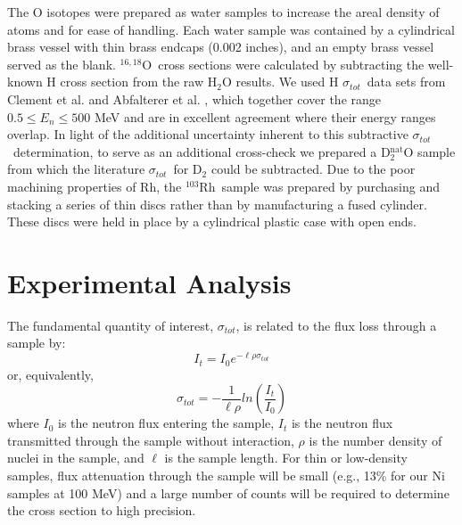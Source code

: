 \documentclass[twocolumn,secnumarabic,amssymb, nobibnotes, aps, prl,
superscriptaddress, nobalancelastpage]{revtex4}
\newcommand{\tot}{\ensuremath{\sigma_{tot}}}
\newcommand{\oSixEight}{\ensuremath{^{16,18}}O}
\newcommand{\rhThree}{\ensuremath{^{103}}R\lowercase{h}}
\begin{document}
The O isotopes were prepared as water samples to increase the areal density
of atoms and for ease of handling. Each water sample was contained by a
cylindrical brass vessel with thin brass endcaps (0.002 inches), and an
empty brass vessel served as the blank. \oSixEight\
cross sections were calculated by
subtracting the well-known H cross section from the raw H$_{2}$O results.
We used H \tot\  data sets from Clement et al. \cite{Clement1972} and Abfalterer
et al. \cite{Abfalterer2001}, which together cover the range $0.5 \leq E_n \leq 500$ MeV
and are in excellent agreement where their energy ranges overlap. In light of
the additional uncertainty inherent to this subtractive \tot\ determination,
to serve as an additional cross-check we prepared a D$_{2}^{\text{nat}}$O sample
from which the literature \tot\ for D$_{2}$ could be subtracted. Due to
the poor machining properties of Rh, the \rhThree\ sample
was prepared by purchasing and stacking a series of thin discs rather than by
manufacturing a fused cylinder. These discs were held in place
by a cylindrical plastic case with open ends.

\section{Experimental Analysis}
The fundamental quantity of interest, \tot, is related to the flux
loss through a sample by:
\begin{equation}
I_{t} = I_{0}e^{-{\ell\rho\sigma_{tot}}}
\end{equation}
or, equivalently,
\begin{equation}
    \tot = -\frac{1}{\ell\rho}ln\left(\frac{I_{t}}{I_{0}}\right)
\end{equation}
where $I_{0}$ is the neutron flux entering the sample, $I_{t}$ is the neutron
flux transmitted through the sample without interaction, $\rho$ is the number
density of nuclei in the sample, and $\ell$ is the sample length. For thin
or low-density samples, flux attenuation through the sample will be small
(e.g., 13\% for our Ni samples at 100 MeV) and a large number
of counts will be required to determine the cross section to high
precision.
\end{document}
